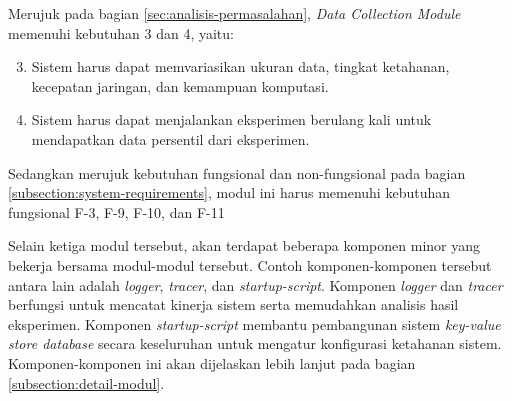 Merujuk pada bagian \ref{sec:analisis-permasalahan}, \textit{Data Collection Module} memenuhi kebutuhan 3 dan 4, yaitu:

\begin{enumerate}
    \setcounter{enumi}{2}
    \item Sistem harus dapat memvariasikan ukuran data, tingkat ketahanan, kecepatan jaringan, dan kemampuan komputasi.
    \item Sistem harus dapat menjalankan eksperimen berulang kali untuk mendapatkan data persentil dari eksperimen.
\end{enumerate}

Sedangkan merujuk kebutuhan fungsional dan non-fungsional pada bagian \ref{subsection:system-requirements}, modul ini harus memenuhi kebutuhan fungsional F-3, F-9, F-10, dan F-11

Selain ketiga modul tersebut, akan terdapat beberapa komponen minor yang bekerja bersama modul-modul tersebut. Contoh komponen-komponen tersebut antara lain adalah \textit{logger}, \textit{tracer}, dan \textit{startup-script}. Komponen \textit{logger} dan \textit{tracer} berfungsi untuk mencatat kinerja sistem serta memudahkan analisis hasil eksperimen. Komponen \textit{startup-script} membantu pembangunan sistem \textit{key-value store database} secara keseluruhan untuk mengatur konfigurasi ketahanan sistem. Komponen-komponen ini akan dijelaskan lebih lanjut pada bagian \ref{subsection:detail-modul}.